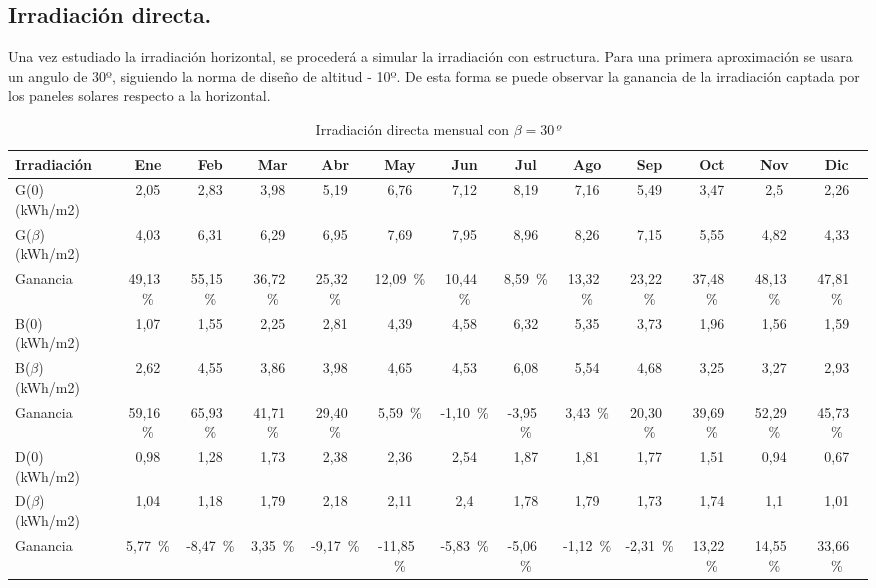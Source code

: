 \documentclass[12pt]{article}
\begin{document}
\subsection{Irradiación directa.}
Una vez estudiado la irradiación horizontal, se procederá a simular la irradiación con estructura. Para una primera aproximación se usara un angulo de 30º, siguiendo la norma de diseño de altitud - 10º. De esta forma se puede observar la ganancia de la irradiación captada por los paneles solares respecto a la horizontal.
\begin{table}[h]
	\centering
	\caption{Irradiación directa mensual con $\beta=30$\textit{º}}
	\label{tab:directa}
	\scriptsize
	\setlength{\tabcolsep}{5pt}
	\begin{tabular}{l*{12}{c}}
		\toprule
		\textbf{Irradiación} & \textbf{Ene} & \textbf{Feb} & \textbf{Mar} & \textbf{Abr} & \textbf{May} & \textbf{Jun} & \textbf{Jul} & \textbf{Ago} & \textbf{Sep} & \textbf{Oct} & \textbf{Nov} & \textbf{Dic} \\
		\midrule
		G(0) (kWh/m2)& 2,05 & 2,83 & 3,98 & 5,19 & 6,76 & 7,12 & 8,19 & 7,16 & 5,49 & 3,47 & 2,5 & 2,26 \\
		
		G($\beta$) (kWh/m2) & 4,03 & 6,31 & 6,29 & 6,95 & 7,69 & 7,95 & 8,96 & 8,26 & 7,15 & 5,55 & 4,82 & 4,33 \\
		Ganancia & 49,13 \% & 55,15 \% & 36,72 \% & 25,32 \% & 12,09 \% & 10,44 \% & 8,59 \% & 13,32 \% & 23,22 \% & 37,48 \% & 48,13 \% & 47,81 \% \\
		
		B(0) (kWh/m2) & 1,07 & 1,55 & 2,25 & 2,81 & 4,39 & 4,58 & 6,32 & 5,35 & 3,73 & 1,96 & 1,56 & 1,59 \\
	
		B($\beta$) (kWh/m2)& 2,62 & 4,55 & 3,86 & 3,98 & 4,65 & 4,53 & 6,08 & 5,54 & 4,68 & 3,25 & 3,27 & 2,93 \\
		
		Ganancia & 59,16 \% & 65,93 \% & 41,71 \% & 29,40 \% & 5,59 \% & -1,10 \% & -3,95 \% & 3,43 \% & 20,30 \% & 39,69 \% & 52,29 \% & 45,73 \% \\
	
		D(0) (kWh/m2) & 0,98 & 1,28 & 1,73 & 2,38 & 2,36 & 2,54 & 1,87 & 1,81 & 1,77 & 1,51 & 0,94 & 0,67 \\
	
		D($\beta$) (kWh/m2) & 1,04 & 1,18 & 1,79 & 2,18 & 2,11 & 2,4 & 1,78 & 1,79 & 1,73 & 1,74 & 1,1 & 1,01 \\
		
		Ganancia & 5,77 \% & -8,47 \% & 3,35 \% & -9,17 \% & -11,85 \% & -5,83 \% & -5,06 \% & -1,12 \% & -2,31 \% & 13,22 \% & 14,55 \% & 33,66 \% \\
		\bottomrule
	\end{tabular}
\end{table}
\end{document}
